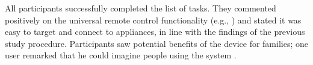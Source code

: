 
All participants successfully completed the list of tasks. They commented positively on the universal remote control functionality (e.g., ) and stated it was easy to target and connect to appliances, in line with the findings of the previous study procedure. Participants saw potential benefits of the device for families; one user remarked that he could imagine people using the system .



